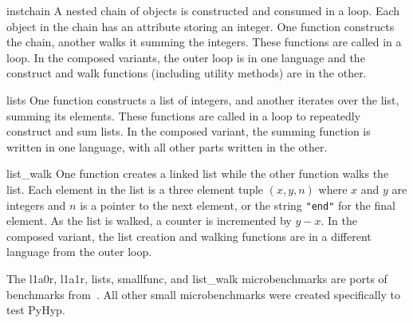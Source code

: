 \documentclass[a4paper,UKenglish]{lipics-v2016}
\newcommand{\ourvm}{PyHyp\xspace}
\begin{document}
\begin{description*}
\item[instchain] A nested chain of objects is constructed and consumed in a
loop. Each object in the chain has an attribute storing an integer. One
function constructs the chain, another walks it summing the integers. These
functions are called in a loop. In the
composed variants, the outer loop is in one language and the construct and
walk functions (including utility methods) are in the other.
\item[lists] One function constructs a list of integers, and another iterates
over the list, summing its elements. These functions are called in a loop to repeatedly
construct and sum lists. In the composed variant, the summing function is
written in one language, with all other parts written in the other.
\item[list\_walk] One function creates a linked list while the other function
walks the list. Each element in the list is a three element tuple $(x, y, n)$ where
$x$ and $y$ are integers and $n$ is a pointer to the next element, or
the string \texttt{"end"} for the final element. As the list is walked, a counter is
incremented by $y-x$.  In the composed variant, the list creation and walking
functions are in a different language from the outer loop.
\end{description*}
The l1a0r, l1a1r, lists, smallfunc, and list\_walk microbenchmarks are
ports of benchmarks from~\cite{barrett15approaches}. All other small microbenchmarks
were created
specifically to test \ourvm.
\end{document}
